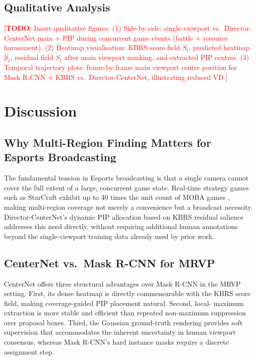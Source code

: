 \documentclass[preprint,12pt]{elsarticle}
\newcommand{\todo}[1]{\textcolor{red}{[\textbf{TODO}: #1]}}
\begin{document}
\subsection{Qualitative Analysis}

\todo{Insert qualitative figures:
(1) Side-by-side: single-viewport vs.\ Director-CenterNet main + PIP during 
    concurrent game events (battle + resource harassment). 
(2) Heatmap visualisation: KBRS score field $S_t$, predicted heatmap 
    $\hat{\mathcal{Y}}_t$, residual field $\tilde{S}_t$ after main viewport 
    masking, and extracted PIP centres.
(3) Temporal trajectory plots: frame-by-frame main viewport centre position 
    for Mask R-CNN + KBRS vs.\ Director-CenterNet, illustrating reduced VD.}

\section{Discussion}
\label{sec:discussion}

\subsection{Why Multi-Region Finding Matters for Esports Broadcasting}

The fundamental tension in Esports broadcasting is that a single camera 
cannot cover the full extent of a large, concurrent game state. Real-time 
strategy games such as StarCraft exhibit up to 40 times the unit count of 
MOBA games \cite{joo2023learning}, making multi-region coverage not merely 
a convenience but a broadcast necessity. Director-CenterNet's dynamic PIP 
allocation based on KBRS residual salience addresses this need directly, 
without requiring additional human annotations beyond the single-viewport 
training data already used by prior work.

\subsection{CenterNet vs.\ Mask R-CNN for MRVP}

CenterNet offers three structural advantages over Mask R-CNN in the MRVP 
setting. First, its dense heatmap is directly commensurable with the KBRS 
score field, making coverage-guided PIP placement natural. Second, local-
maximum extraction is more stable and efficient than repeated non-maximum 
suppression over proposal boxes. Third, the Gaussian ground-truth rendering 
provides soft supervision that accommodates the inherent uncertainty in 
human viewport consensus, whereas Mask R-CNN's hard instance masks require 
a discrete assignment step.
\end{document}

